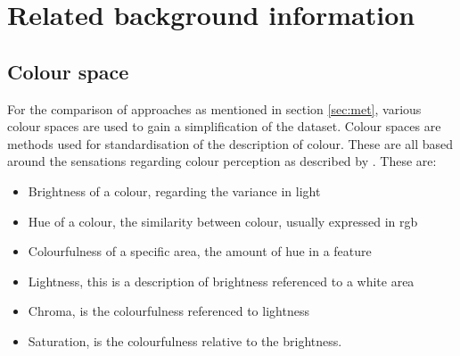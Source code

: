 \section{Related background information} \label{sec:relb}
\subsection{Colour space}
For the comparison of approaches as mentioned in section \ref{sec:met}, various colour spaces are used to gain a simplification of the dataset. Colour spaces are methods used for standardisation of the description of colour. These are all based around the sensations regarding colour perception as described by \citet{Hunt2011, ford1998colour}. These are:\\
\begin{itemize}
	\item Brightness of a colour, regarding the variance in light
	\item Hue of a colour, the similarity between colour, usually expressed in \ac{rgb}
	\item Colourfulness of a specific area, the amount of hue in a feature
	\item Lightness, this is a description of brightness referenced to a white area
	\item Chroma, is the colourfulness referenced to lightness
	\item Saturation, is the colourfulness relative to the brightness.\\
\end{itemize}

